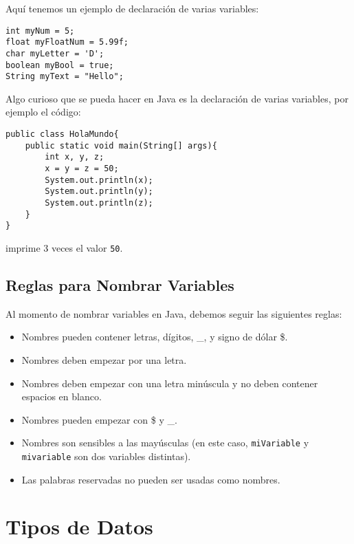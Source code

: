 \documentclass[12pt]{article}
\theoremstyle{largebreak}
\begin{document}
    Aquí tenemos un ejemplo de declaración de varias variables:
    \begin{lstlisting}[caption={Declaración de variables de varios tipos},label=DescriptiveLabel]
int myNum = 5;
float myFloatNum = 5.99f;
char myLetter = 'D';
boolean myBool = true;
String myText = "Hello";
    \end{lstlisting}

    \begin{obs}
        Algo curioso que se pueda hacer en Java es la declaración de varias variables, por ejemplo el código:

        \begin{lstlisting}[caption={Declaración de múltiples variables en una línea},label=DescriptiveLabel]
public class HolaMundo{
    public static void main(String[] args){
        int x, y, z;
        x = y = z = 50;
        System.out.println(x);
        System.out.println(y);
        System.out.println(z);
    }
}
        \end{lstlisting}

        imprime 3 veces el valor \lstinline|50|.
    \end{obs}

    \subsection{Reglas para Nombrar Variables}

    Al momento de nombrar variables en Java, debemos seguir las siguientes reglas:
    \begin{itemize}
        \item Nombres pueden contener letras, dígitos, \_, y signo de dólar \$.
        \item Nombres deben empezar por una letra.
        \item Nombres deben empezar con una letra minúscula y no deben contener espacios en blanco.
        \item Nombres pueden empezar con \$ y \_.
        \item Nombres son sensibles a las mayúsculas (en este caso, \lstinline|miVariable| y \lstinline|mivariable| son dos variables distintas).
        \item Las palabras reservadas no pueden ser usadas como nombres.
    \end{itemize}

    \section{Tipos de Datos}
\end{document}

